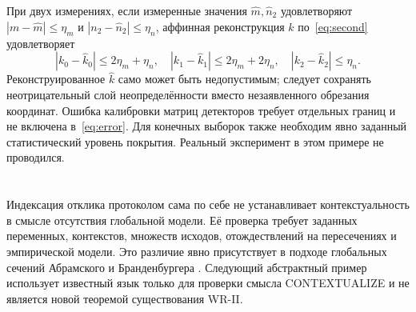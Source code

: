 {При двух измерениях, если измеренные значения $\widehat m,\widehat n_2$ удовлетворяют $|m-\widehat m|\leq\eta_m$ и $|n_2-\widehat n_2|\leq\eta_n$, аффинная реконструкция $\widehat k$ по~\eqref{eq:second} удовлетворяет}
\begin{equation}\label{eq:error}
 |k_0-\widehat k_0|\leq2\eta_m+\eta_n,\quad
 |k_1-\widehat k_1|\leq2\eta_m+2\eta_n,\quad
 |k_2-\widehat k_2|\leq\eta_n.
\end{equation}
{Реконструированное $\widehat k$ само может быть недопустимым; следует сохранять неотрицательный слой неопределённости вместо незаявленного обрезания координат. Ошибка калибровки матриц детекторов требует отдельных границ и не включена в~\eqref{eq:error}. Для конечных выборок также необходим явно заданный статистический уровень покрытия. Реальный эксперимент в этом примере не проводился.}

\section{}
\label{sec:context}
{Индексация отклика протоколом сама по себе не устанавливает контекстуальность в смысле отсутствия глобальной модели. Её проверка требует заданных переменных, контекстов, множеств исходов, отождествлений на пересечениях и эмпирической модели. Это различие явно присутствует в подходе глобальных сечений Абрамского и Бранденбургера \cite{AB}. Следующий абстрактный пример использует известный язык только для проверки смысла CONTEXTUALIZE и не является новой теоремой существования WR-II.}

